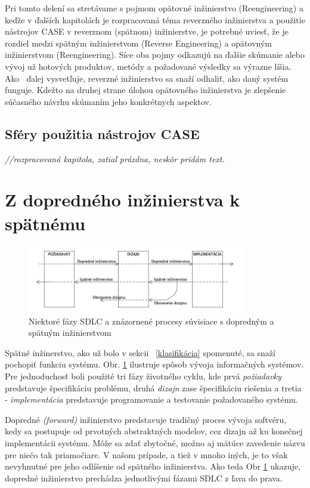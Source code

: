 \documentclass[10pt,twoside,slovak,a4paper]{article}
\begin{document}
Pri tomto delení sa stretávame s pojmom opätovné inžinierstvo (Reengineering) a keďže v ďalších kapitolách je rozpracovaná téma reverzného inžinierstva a použitie nástrojov CASE v reverznom (spätnom) inžinierstve, je potrebné uviesť, že je rozdiel medzi spätným inžinierstvom (Reverse Engineering) a opätovným inžinierstvom (Reengineering). Síce oba pojmy odkazujú na ďalšie skúmanie alebo vývoj už hotových produktov, metódy a požadované výsledky sa výrazne líšia.  Ako~\cite{reengineering} ďalej vysvetľuje, reverzné inžinierstvo sa snaží odhaliť, ako daný systém funguje. Kdežto na druhej strane úlohou opätovného inžinierstva je zlepšenie súčasného návrhu skúmaním jeho konkrétnych aspektov. 

\subsection{Sféry použitia nástrojov CASE}\label{sféry}
\emph{//rozpracovaná kapitola, zatiaľ prázdna, neskôr pridám text.}

\section{Z dopredného inžinierstva k spätnému}\label{forward vs reverse}
\begin{figure}[tbh]
\centering
\includegraphics[width=0.85\textwidth]{forward_reverse.jpg}
\caption{Niektoré fázy SDLC a znázornené procesy súvisiace s dopredným a spätným inžinierstvom \cite{2010}}
\label{obr_forward_reverse}
\end{figure}

Spätné inžinerstvo, ako už bolo v sekcii~ \ref{klasifikácia} spomenuté, sa snaží pochopiť funkciu systému. Obr. \ref{obr_forward_reverse} ilustruje spôsob vývoja informačných systémov. Pre jednoduchosť boli použité tri fázy životného cyklu, kde prvá \emph{požiadavky} predstavuje špecifikáciu problému, druhá \emph{dizajn} zase špecifikáciu riešenia a tretia -  \emph{implementácia} predstavuje programovanie a testovanie požadovaného systému.

Dopredné \textit{(forward)} inžinierstvo predstavuje tradičný proces vývoja softvéru, kedy sa postupuje od prvotných abstraktných modelov, cez dizajn až ku konečnej implementácii systému. Môže sa zdať zbytočné, možno aj mätúce zavedenie názvu pre niečo tak priamočiare. V našom prípade, a tiež v mnoho iných, je to však nevyhnutné pre jeho odlíšenie od spätného inžinierstva. Ako teda Obr \ref{obr_forward_reverse} ukazuje, dopredné inžinierstvo prechádza jednotlivými fázami SDLC z ľava do prava.
\end{document}
